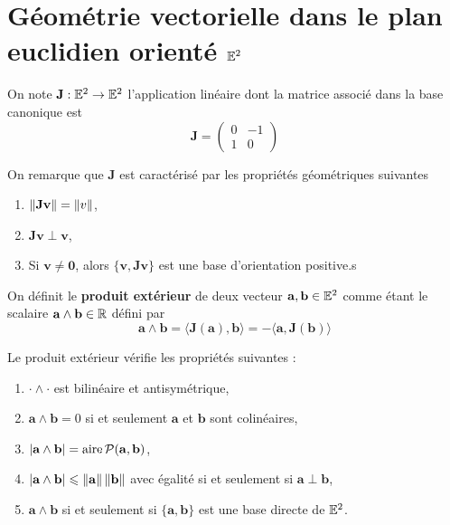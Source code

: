 
\section{Géométrie vectorielle dans le plan euclidien orienté $\mathbb E^2$}

\begin{definition}
	On note $\mathbf{J} : \mathbb E^2 \to \mathbb E^2$ l'application linéaire dont la matrice associé dans la base canonique est
	\[
	\bm J = \begin{pmatrix}
		0 & -1 \\ 1 & 0
	\end{pmatrix}
	\]
\end{definition}

\begin{remarque}
	On remarque que $\bm J$ est caractérisé par les propriétés géométriques suivantes
	\begin{enumerate}
		\item $\left\| \mathbf{J} \mathbf{v} \right\| = \left\| v \right\|$,
		\item $\bm J \bm v \perp \bm v$,
		\item Si $\bm v \neq \bm 0$, alors $\{\bm v, \bm J \bm v\}$ est une base d'orientation positive.s
	\end{enumerate}
\end{remarque}

\begin{definition}
	On définit le \textbf{produit extérieur} de deux vecteur $\mathbf{a}, \mathbf{b} \in \mathbb E^2$ comme étant le scalaire $\mathbf{a} \land \mathbf{b} \in \mathbb{R}$ défini par
	\[
	\bm a \land \bm b = \langle \bm J(\bm a), \bm b \rangle = -\langle \bm a, \bm J (\bm b) \rangle
	\]
\end{definition}

\begin{proposition}
	Le produit extérieur vérifie les propriétés suivantes :
	\begin{enumerate}
		\item $\cdot \land \cdot$ est bilinéaire et antisymétrique,
		\item $\bm a \land \bm b = 0$ si et seulement $\bm a$ et $\bm b$ sont colinéaires,
		\item $|\mathbf{a} \land \mathbf{b} | = \operatorname{aire}\mathcal P(\mathbf{a}, \mathbf{b})$,
		\item $|\mathbf{a} \land \mathbf{b} | \leqslant \left\| \mathbf{a} \right\| \left\| \mathbf{b} \right\|$ avec égalité si et seulement si $\bm a \perp \bm b$,
		\item $\bm a \land \bm b$ si et seulement si $\{\bm a, \bm b\}$ est une base directe de $\mathbb E^2$.
	\end{enumerate}
\end{proposition}



